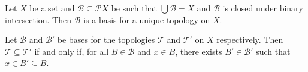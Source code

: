 \begin{cor}
  \label{cor:topology:basis:generate}
  Let $X$ be a set and $\mathcal{B} \subseteq \mathcal{P} X$ be such that
  $\bigcup \mathcal{B} = X$ and $\mathcal{B}$ is closed under binary
  intersection. Then $\mathcal{B}$ is a basis for a unique topology on $X$.
\end{cor}

\begin{lm}
  \label{lm:topology:basis:finer}
  Let $\mathcal{B}$ and $\mathcal{B}'$ be bases for the topologies
  $\mathcal{T}$ and $\mathcal{T}'$ on $X$ respectively. Then $\mathcal{T}
  \subseteq \mathcal{T}'$ if and only if, for all $B \in \mathcal{B}$ and $x
  \in B$, there exists $B' \in \mathcal{B}'$ such that $x \in B' \subseteq B$.
\end{lm}

